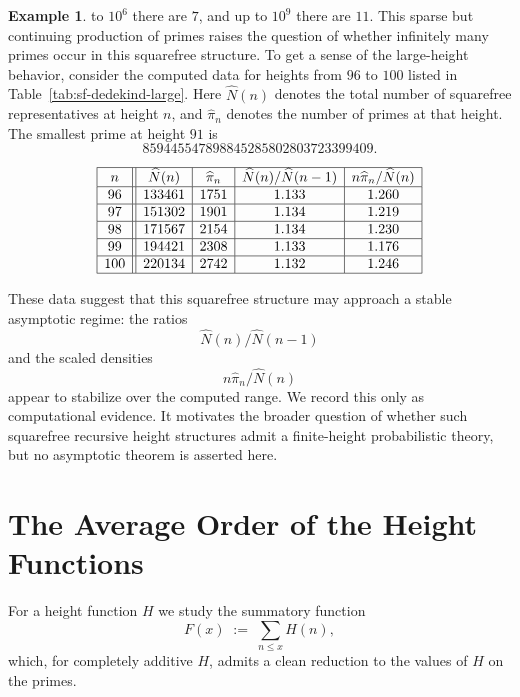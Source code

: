 \documentclass[11pt]{article}
\theoremstyle{definition}
\newtheorem{example}{Example}
\begin{document}
\begin{example}
to \(10^6\) there are \(7\), and up to \(10^9\) there are \(11\).  This sparse
but continuing production of primes raises the question of whether infinitely
many primes occur in this squarefree structure.
To get a sense of the large-height behavior, consider the computed data for heights from \(96\) to \(100\) listed in Table~\ref{tab:sf-dedekind-large}.  Here \(\widehat N(n)\) denotes the
total number of squarefree representatives at height \(n\), and
\(\widehat\pi_n\) denotes the number of primes at that height.  The smallest
prime at height \(91\) is
\[
  859445547898845285802803723399409.
\]
\begin{table}[ht]
\centering
\[
\begin{array}{|c||c|c|c|c|}
\hline
n & \widehat N(n) & \widehat\pi_n
  & \widehat N(n)/\widehat N(n-1)
  & n\widehat\pi_n/\widehat N(n) \\
\hline
96 & 133461 & 1751 & 1.133 & 1.260 \\ \hline
97 & 151302 & 1901 & 1.134 & 1.219 \\ \hline
98 & 171567 & 2154 & 1.134 & 1.230 \\ \hline
99 & 194421 & 2308 & 1.133 & 1.176 \\ \hline
100 & 220134 & 2742 & 1.132 & 1.246 \\ \hline
\end{array}
\]
\caption{\(\widehat N(n)\) and \(\widehat\pi_n\) for \(n=96,\dots,100\) in the
squarefree Dedekind-type structure.}
\label{tab:sf-dedekind-large}
\end{table}
These data suggest that this squarefree structure may approach a stable
asymptotic regime: the ratios
\[
  \widehat N(n)/\widehat N(n-1)
\]
and the scaled densities
\[
  n\widehat\pi_n/\widehat N(n)
\]
appear to stabilize over the computed range.  We record this only as
computational evidence.  It motivates the broader question of whether such
squarefree recursive height structures admit a finite-height probabilistic
theory, but no asymptotic theorem is asserted here.
\end{example}

\section{The Average Order of the Height Functions}\label{sec5}

For a height function $H$ we study the summatory function
\[
  F(x) \;:=\; \sum_{n\le x} H(n),
\]
which, for completely additive $H$, admits a clean reduction to the values of
$H$ on the primes.
\end{document}
